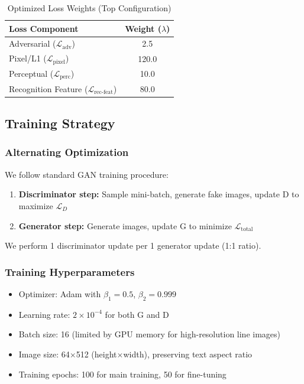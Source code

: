\documentclass[journal]{IEEEtran}
\begin{document}
\begin{table}[!t]
\renewcommand{\arraystretch}{1.3}
\caption{Optimized Loss Weights (Top Configuration)}
\label{table_optimal_weights}
\centering
\begin{tabular}{|l|c|}
\hline
\textbf{Loss Component} & \textbf{Weight ($\lambda$)} \\
\hline
Adversarial ($\mathcal{L}_{\text{adv}}$) & 2.5 \\
Pixel/L1 ($\mathcal{L}_{\text{pixel}}$) & 120.0 \\
Perceptual ($\mathcal{L}_{\text{perc}}$) & 10.0 \\
Recognition Feature ($\mathcal{L}_{\text{rec-feat}}$) & 80.0 \\
\hline
\end{tabular}
\end{table}

\subsection{Training Strategy}

\subsubsection{Alternating Optimization}

We follow standard GAN training procedure:
\begin{enumerate}
    \item \textbf{Discriminator step:} Sample mini-batch, generate fake images, update D to maximize $\mathcal{L}_D$
    \item \textbf{Generator step:} Generate images, update G to minimize $\mathcal{L}_{\text{total}}$
\end{enumerate}

We perform 1 discriminator update per 1 generator update (1:1 ratio).

\subsubsection{Training Hyperparameters}

\begin{itemize}
    \item Optimizer: Adam with $\beta_1=0.5$, $\beta_2=0.999$
    \item Learning rate: $2 \times 10^{-4}$ for both G and D
    \item Batch size: 16 (limited by GPU memory for high-resolution line images)
    \item Image size: 64$\times$512 (height$\times$width), preserving text aspect ratio
    \item Training epochs: 100 for main training, 50 for fine-tuning
\end{itemize}
\end{document}
